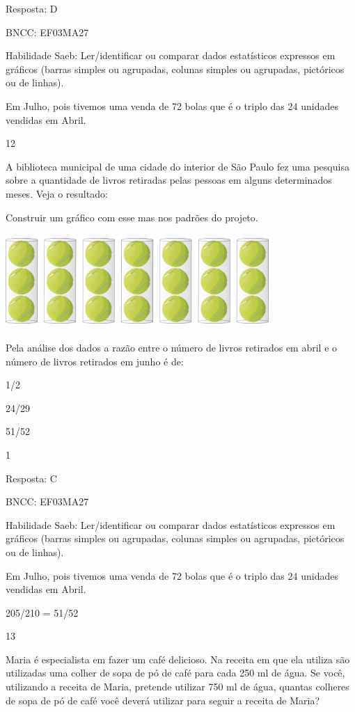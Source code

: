 \begin{escolha}
Resposta: D

BNCC: EF03MA27

Habilidade Saeb: Ler/identificar ou comparar dados estatísticos
expressos em gráficos (barras simples ou agrupadas, colunas simples ou
agrupadas, pictóricos ou de linhas).

Em Julho, pois tivemos uma venda de 72 bolas que é o triplo das 24
unidades vendidas em Abril.

\num{12}

A biblioteca municipal de uma cidade do interior de São Paulo fez uma
pesquisa sobre a quantidade de livros retiradas pelas pessoas em alguns
determinados meses. Veja o resultado:

Construir um gráfico com esse mas nos padrões do projeto.

\includegraphics[width=3.93590in,height=1.40906in]{media/image121.png}

Pela análise dos dados a razão entre o número de livros retirados em
abril e o número de livros retirados em junho é de:

\begin{escolha}
\item
  1/2
\item
  24/29
\item
  51/52
\item
  1
\end{escolha}

Resposta: C

BNCC: EF03MA27

Habilidade Saeb: Ler/identificar ou comparar dados estatísticos
expressos em gráficos (barras simples ou agrupadas, colunas simples ou
agrupadas, pictóricos ou de linhas).

Em Julho, pois tivemos uma venda de 72 bolas que é o triplo das 24
unidades vendidas em Abril.

205/210 = 51/52

\num{13}

Maria é especialista em fazer um café delicioso. Na receita em que ela
utiliza são utilizadas uma colher de sopa de pó de café para cada 250 ml
de água. Se você, utilizando a receita de Maria, pretende utilizar 750
ml de água, quantas colheres de sopa de pó de café você deverá utilizar
para seguir a receita de Maria?


\end{escolha}
